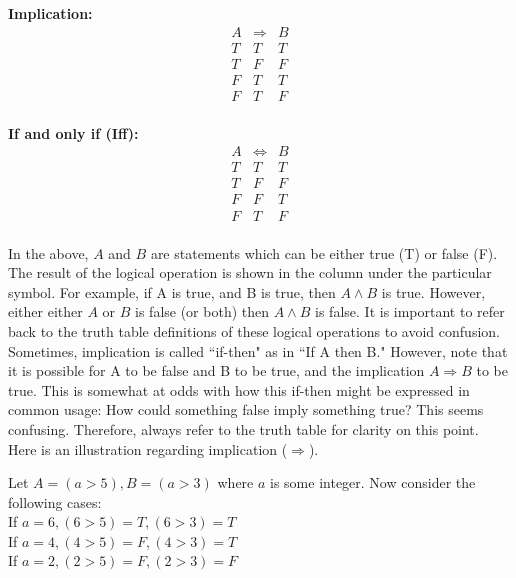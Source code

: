 \textbf{Implication:}
\begin{displaymath}
\begin{array}{|c|c|c|}
A & \Longrightarrow & B \\
\hline
T & T & T  \\
T & F & F  \\
F & T & T  \\
F & T & F  \\
\end{array}
\end{displaymath}

\textbf{If and only if (Iff):}  
\begin{displaymath}
\begin{array}{|c|c|c|}
A & \Longleftrightarrow & B \\
\hline
T & T & T  \\
T & F & F  \\
F & F & T  \\
F & T & F  \\
\end{array}
\end{displaymath}

In the above, $A$ and $B$ are statements which can be either true (T) or false (F).  The result of the logical operation is shown in the column under the particular symbol.  For example, if A is true, and B is true, then $A \land B$ is true.  However, either either $A$ or $B$ is false (or both) then $A \land B$ is false.  It is important to refer back to the truth table definitions of these logical operations to avoid confusion.\\  

Sometimes, implication is called ``if-then" as in ``If A then B."  However, note that it is possible for A to be false and B to be true, and the implication $A \Longrightarrow B$ to be true.  This is somewhat at odds with how this if-then might be expressed in common usage: How could something false imply something true?  This seems confusing.  Therefore, always refer to the truth table for clarity on this point.\\

Here is an illustration regarding implication ($\Longrightarrow$).

Let $A=(a > 5), B=(a > 3)$ where $a$ is some integer.  Now consider the following cases: \\
If $a=6, (6 > 5)=\textit{T}, (6 > 3)=\textit{T}$ \\  
If $a=4, (4 > 5)=\textit{F}, (4 > 3)=\textit{T}$  \\
If $a=2, (2 > 5)=\textit{F}, (2 > 3)=\textit{F}$ \\

